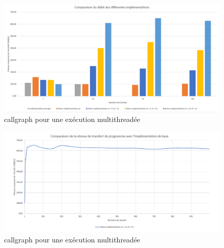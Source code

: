 \documentclass[../main.tex]{subfiles}
\begin{document}
\newpage
\begin{figure}
    \includegraphics[scale=1.2]{assets/test_mul.PNG}
    \caption{callgraph pour une exécution multithreadée}
    \label{sec:plot_mul_recv}
\end{figure}

\newpage
\begin{figure}
    \includegraphics[scale=1.2]{assets/test_max.PNG}
    \caption{callgraph pour une exécution multithreadée}
    \label{sec:plot_max}
\end{figure}
\end{document}
